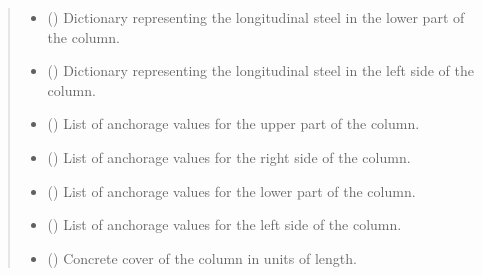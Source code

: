\documentclass[a4paper,10pt,english]{sphinxmanual}
\begin{document}
\begin{fulllineitems}
\begin{quote}
\begin{description}
\begin{itemize}
\item {} 
\sphinxAtStartPar
{} (\sphinxstyleliteralemphasis{\sphinxupquote{, }}) \textendash{} Dictionary representing the longitudinal steel in the lower part of the column.

\item {} 
\sphinxAtStartPar
{} (\sphinxstyleliteralemphasis{\sphinxupquote{, }}) \textendash{} Dictionary representing the longitudinal steel in the left side of the column.

\item {} 
\sphinxAtStartPar
{} (\sphinxstyleliteralemphasis{\sphinxupquote{, }}) \textendash{} List of anchorage values for the upper part of the column.

\item {} 
\sphinxAtStartPar
{} (\sphinxstyleliteralemphasis{\sphinxupquote{, }}) \textendash{} List of anchorage values for the right side of the column.

\item {} 
\sphinxAtStartPar
{} (\sphinxstyleliteralemphasis{\sphinxupquote{, }}) \textendash{} List of anchorage values for the lower part of the column.

\item {} 
\sphinxAtStartPar
{} (\sphinxstyleliteralemphasis{\sphinxupquote{, }}) \textendash{} List of anchorage values for the left side of the column.

\item {} 
\sphinxAtStartPar
{} (\sphinxstyleliteralemphasis{\sphinxupquote{, }}) \textendash{} Concrete cover of the column in units of length.


\end{itemize}
\end{description}
\end{quote}
\end{fulllineitems}
\end{document}

